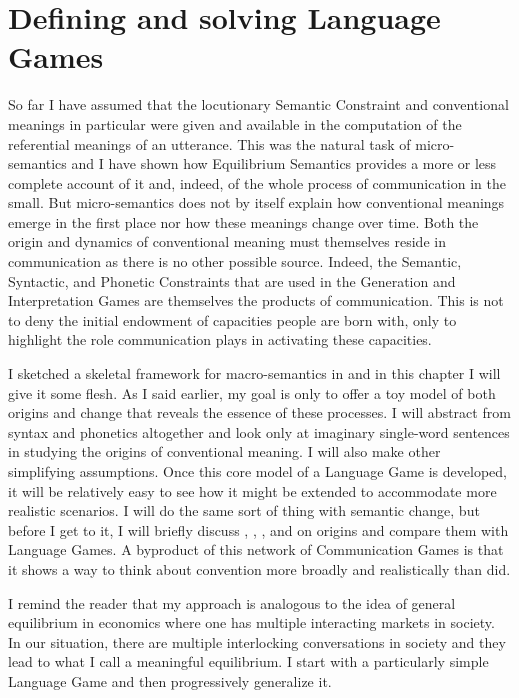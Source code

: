 \chapter{Defining and solving Language Games} \label{ch:defining and solving language games}
So far I have assumed that the locutionary Semantic Constraint and conventional meanings in particular were given and available in the computation of the referential meanings of an utterance. This was the natural task of micro-semantics and I have shown how Equilibrium Semantics provides a more or less complete account of it and, indeed, of the whole process of communication in the small. But micro-semantics does not by itself explain how conventional meanings emerge in the first place nor how these meanings change over time. Both the origin and dynamics of conventional meaning must themselves reside in communication as there is no other possible source. Indeed, the Semantic, Syntactic, and Phonetic Constraints that are used in the Generation and Interpretation Games are themselves the products of communication. This is not to deny the initial endowment of capacities people are born with, only to highlight the role communication plays in activating these capacities.

I sketched a skeletal framework for macro-semantics in  and in this chapter I will give it some flesh. As I said earlier, my goal is only to offer a toy model of both origins and change that reveals the essence of these processes. I will abstract from syntax and phonetics altogether and look only at imaginary single-word sentences in studying the origins of conventional meaning. I will also make other simplifying assumptions. Once this core model of a Language Game is developed, it will be relatively easy to see how it might be extended to accommodate more realistic scenarios. I will do the same sort of thing with semantic change, but before I get to it, I will briefly discuss \citet{grice:umsmwm}, \citet{lewis:c}, \citet{skyrms:s}, and \citet{tomasello:ohc} on origins and compare them with Language Games. A byproduct of this network of Communication Games is that it shows a way to think about convention more broadly and realistically than \citet{lewis:c} did.

I remind the reader that my approach is analogous to the idea of general equilibrium in economics where one has multiple interacting markets in society. In our situation, there are multiple interlocking conversations in society and they lead to what I call a meaningful equilibrium. I start with a particularly simple Language Game and then progressively generalize it.



